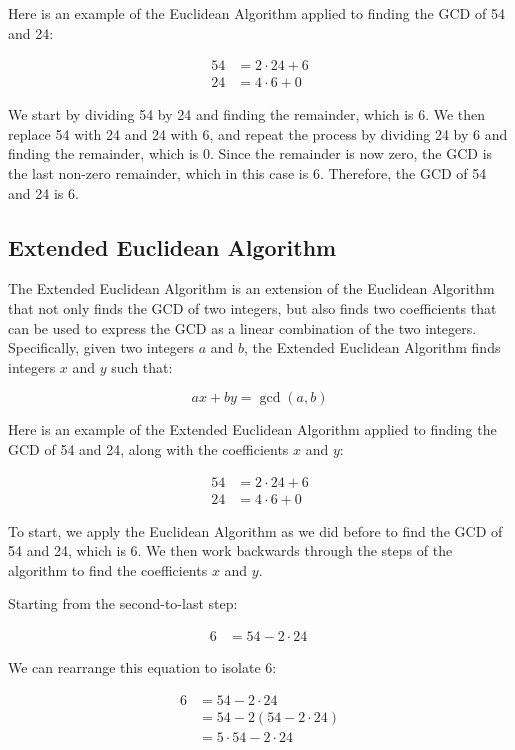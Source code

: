\documentclass[openany]{book}
\begin{document}
Here is an example of the Euclidean Algorithm applied to finding the GCD of 54 and 24:

\begin{align*}
	54 & = 2 \cdot 24 + 6 \\
	24 & = 4 \cdot 6 + 0 \
\end{align*}

We start by dividing 54 by 24 and finding the remainder, which is 6. We then replace 54 with 24 and 24 with 6, and repeat the process by dividing 24 by 6 and finding the remainder, which is 0. Since the remainder is now zero, the GCD is the last non-zero remainder, which in this case is 6. Therefore, the GCD of 54 and 24 is 6.

\subsection{Extended Euclidean Algorithm}
The Extended Euclidean Algorithm is an extension of the Euclidean Algorithm that not only finds the GCD of two integers, but also finds two coefficients that can be used to express the GCD as a linear combination of the two integers. Specifically, given two integers $a$ and $b$, the Extended Euclidean Algorithm finds integers $x$ and $y$ such that:

$$ax + by = \gcd(a, b)$$

Here is an example of the Extended Euclidean Algorithm applied to finding the GCD of 54 and 24, along with the coefficients $x$ and $y$:

\begin{align*}
	54 & = 2 \cdot 24 + 6 \\
	24 & = 4 \cdot 6 + 0 \
\end{align*}

To start, we apply the Euclidean Algorithm as we did before to find the GCD of 54 and 24, which is 6. We then work backwards through the steps of the algorithm to find the coefficients $x$ and $y$.

Starting from the second-to-last step:

\begin{align*}
	6 & = 54 - 2 \cdot 24 \
\end{align*}

We can rearrange this equation to isolate 6:

\begin{align*}
	6 & = 54 - 2 \cdot 24 \\
	  & = 54 - 2(54 - 2 \cdot 24) \\
	  & = 5 \cdot 54 - 2 \cdot 24
\end{align*}
\end{document}
